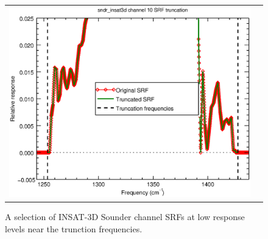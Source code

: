 \begin{figure}[H]
\begin{tabular}{c c}
    \includegraphics[scale=0.35]{graphics/sndr/trunc/sndr_insat3d-10.trunc.eps}
  \end{tabular}
  \caption{A selection of INSAT-3D Sounder channel SRFs at low response levels near the trunction frequencies.}
  \label{fig:sndr_selection_trunc}
\end{figure}


\clearpage




\begin{appendix}
  
  
\end{appendix}



